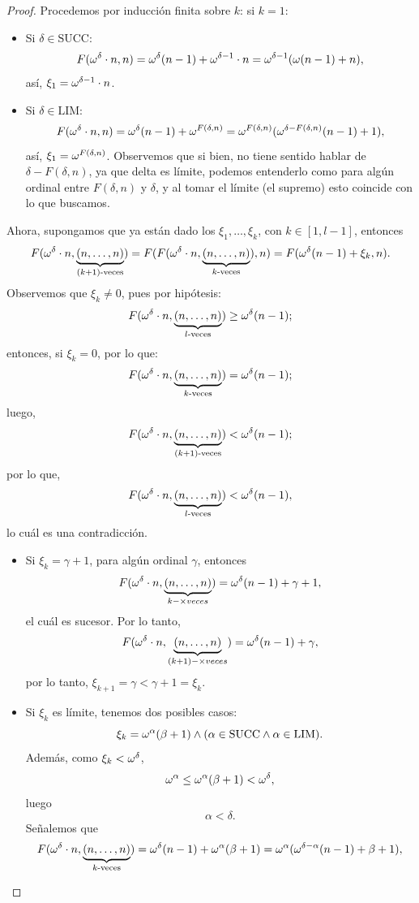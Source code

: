 \begin{proof}
    Procedemos por inducción finita sobre $k$: si $k=1$:
    \begin{itemize}
        \item Si $\delta\in\text{SUCC}$:
            \[F(\omega^\delta\cdot n,n)=\omega^\delta(n-1)+\omega^{\delta-1}\cdot n=\omega^{\delta-1}(\omega(n-1)+n),\]
            así, $\xi_1=\omega^{\delta-1}\cdot n$.
        \item Si $\delta\in\text{LIM}$:
            \[F(\omega^\delta\cdot n,n)=\omega^\delta(n-1)+\omega^{F(\delta,n)}=\omega^{F(\delta,n)}(\omega^{\delta-F(\delta,n)}(n-1)+1),\]
            así, $\xi_1=\omega^{F(\delta,n)}$. Observemos que si bien, no tiene sentido hablar de $\delta-F(\delta,n)$, ya que delta es límite, podemos entenderlo como para algún ordinal entre $F(\delta,n)$ y $\delta$, y al tomar el límite (el supremo) esto coincide con lo que buscamos.
    \end{itemize}
    Ahora, supongamos que ya están dado los $\xi_1,\ldots,\xi_k$, con $k\in[1,l-1]$, entonces
    \[F(\omega^\delta\cdot n,\underbrace{(n,\ldots,n)}_{(k+1)\text{-veces}})=F(F(\omega^\delta\cdot n,\underbrace{(n,\ldots,n)}_{k\text{-veces}}),n)=F(\omega^\delta(n-1)+\xi_k,n).\]
    Observemos que $\xi_k\neq 0$, pues por hipótesis:
    \[F(\omega^\delta\cdot n,\underbrace{(n,\ldots,n)}_{l\text{-veces}})\geq \omega^\delta(n-1);\]
    entonces, si $\xi_k=0$, por lo que:
    \[F(\omega^\delta\cdot n,\underbrace{(n,\ldots,n)}_{k\text{-veces}})=\omega^\delta(n-1);\]
    luego,
    \[F(\omega^\delta\cdot n,\underbrace{(n,\ldots,n)}_{(k+1)\text{-veces}})<\omega^\delta(n-1);\]
    por lo que,
    \[F(\omega^\delta\cdot n,\underbrace{(n,\ldots,n)}_{l\text{-veces}})<\omega^\delta(n-1),\]
    lo cuál es una contradicción.
    \begin{itemize}
        \item Si $\xi_k=\gamma+1$, para algún ordinal $\gamma$, entonces
            \[F(\omega^\delta\cdot n,\underbrace{(n,\ldots,n)}_{k-\times{veces}})=\omega^\delta(n-1)+\gamma+1,\]
            el cuál es sucesor. Por lo tanto,
            \[F(\omega^\delta\cdot n,\underbrace{(n,\ldots,n)}_{(k+1)-\times{veces}})=\omega^\delta(n-1)+\gamma,\]
            por lo tanto, $\xi_{k+1}=\gamma<\gamma+1=\xi_k$.
        \item Si $\xi_k$ es límite, tenemos dos posibles casos:
            \[\xi_k=\omega^{\alpha}(\beta+1)\land (\alpha\in\text{SUCC} \land \alpha\in\text{LIM}).\]
            Además, como $\xi_k<\omega^\delta$, 
            \[\omega^\alpha\leq\omega^\alpha(\beta+1)<\omega^\delta,\]
            luego
            \[\alpha<\delta.\]
            Señalemos que
            \[F(\omega^\delta\cdot n,\underbrace{(n,\ldots,n)}_{k\text{-veces}})=\omega^\delta(n-1)+\omega^\alpha(\beta+1)=\omega^\alpha(\omega^{\delta-\alpha}(n-1)+\beta+1),\]

\end{itemize}
\end{proof}
